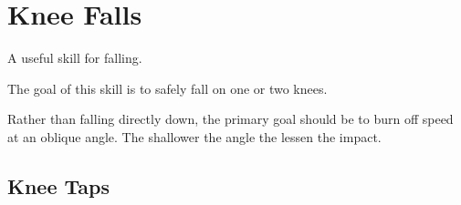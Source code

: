 \section{Knee Falls}
\label{sec:falls/knee_falls}

A useful skill for falling.

The goal of this skill is to safely fall on one or two knees. 


Rather than falling directly down, the primary goal should be to burn off speed at an oblique angle. 
The shallower the angle the lessen the impact. 



\subsection*{Knee Taps}

